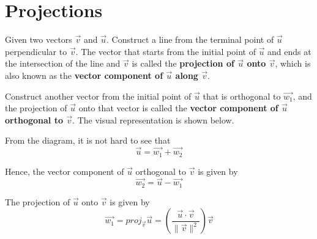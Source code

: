 \documentclass{report}
\begin{document}
\chapter{Projections}

Given two vectors $\vec{v}$ and $\vec{u}$. Construct a line from the terminal
point of $\vec{u}$ perpendicular to $\vec{v}$. The vector that starts from the
initial point of $\vec{u}$ and ends at the intersection of the line and
$\vec{v}$ is called the \textbf{projection of $\vec{u}$ onto $\vec{v}$}, which
is also known as the \textbf{vector component of $\vec{u}$ along $\vec{v}$}.

Construct another vector from the initial point of $\vec{u}$ that is orthogonal
to $\vec{w_1}$, and the projection of $\vec{u}$ onto that vector is called the
\textbf{vector component of $\vec{u}$ orthogonal to $\vec{v}$}. The visual
representation is shown below.
\begin{center}
\end{center}

From the diagram, it is not hard to see that \[\vec{u} = \vec{w_1} + \vec{w_2}\]

Hence, the vector component of $\vec{u}$ orthogonal to $\vec{v}$ is given by \[\vec{w_2} = \vec{u} - \vec{w_1}\]

The projection of $\vec{u}$ onto $\vec{v}$ is given by \[\vec{w_1} = proj_{\vec{v}}\vec{u} = \left(\frac{\vec{u} \cdot \vec{v}}{\lVert \vec{v} \rVert^2}\right)\vec{v}\]
\end{document}
